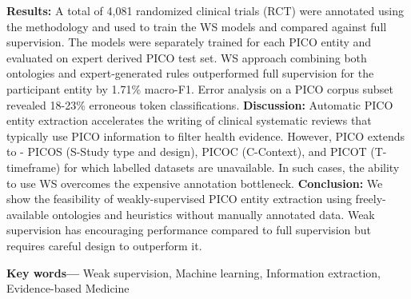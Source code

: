 \documentclass[10.7pt,]{article}
\providecommand{\keywords}[1]
{
  \small	
  \textbf{Key words---} #1
}
\begin{document}
\textbf{Results:}
A total of 4,081 randomized clinical trials (RCT) were annotated using the methodology and used to train the WS models and compared against full supervision.
The models were separately trained for each PICO entity and evaluated on expert derived PICO test set.
WS approach combining both ontologies and expert-generated rules outperformed full supervision for the participant entity by 1.71\% macro-F1.
Error analysis on a PICO corpus subset revealed 18-23\% erroneous token classifications.
\textbf{Discussion:}
Automatic PICO entity extraction accelerates the writing of clinical systematic reviews that typically use PICO information to filter health evidence.
However, PICO extends to - PICOS (S-Study type and design), PICOC (C-Context), and PICOT (T-timeframe) for which labelled datasets are unavailable.
In such cases, the ability to use WS overcomes the expensive annotation bottleneck.
\textbf{Conclusion:}
We show the feasibility of weakly-supervised PICO entity extraction using freely-available ontologies and heuristics without manually annotated data. Weak supervision has encouraging performance compared to full supervision but requires careful design to outperform it. 


\keywords{Weak supervision, Machine learning, Information extraction, Evidence-based Medicine}


%
\clearpage
%
\end{document}
